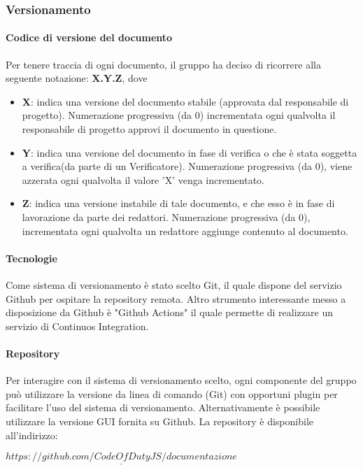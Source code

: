		\subsubsection{Versionamento}
			
			\paragraph{Codice di versione del documento}
			Per tenere traccia di ogni documento, il gruppo ha deciso di ricorrere alla seguente notazione: \textbf{X.Y.Z}, dove
			\begin{itemize}
				
				\item \textbf{X}: indica una versione del documento stabile (approvata dal responsabile di progetto). Numerazione progressiva (da 0) incrementata ogni qualvolta il responsabile di progetto approvi il documento in questione.
				
				\item \textbf{Y}: indica una versione del documento in fase di verifica o che è stata soggetta a verifica(da parte di un Verificatore). Numerazione progressiva (da 0), viene azzerata ogni qualvolta il valore 'X' venga incrementato.
				
				\item \textbf{Z}: indica una versione instabile di tale documento, e che esso è in fase di lavorazione da parte dei redattori. Numerazione progressiva (da 0), incrementata ogni qualvolta un redattore aggiunge contenuto al documento.
			\end{itemize}
			
			\paragraph{Tecnologie}
			Come sistema di versionamento è stato scelto Git, il quale dispone del servizio Github per ospitare la repository remota. Altro strumento interessante messo a disposizione da Github è "Github Actions" il quale permette di realizzare un servizio di Continuos Integration.
			
			\paragraph{Repository}
			Per interagire con il sistema di versionamento scelto, ogni componente del gruppo può utilizzare la versione da linea di comando (Git) con opportuni plugin per facilitare l'uso del sistema di versionamento. Alternativamente è possibile utilizzare la versione GUI fornita su Github. La repository è disponibile all'indirizzo:\\
			\begin{center}
				$\underline{https://github.com/CodeOfDutyJS/documentazione}$
			\end{center}
			
